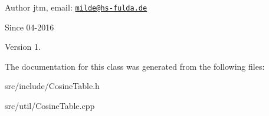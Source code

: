 \begin{DoxyAuthor}{Author}
jtm, email\-:  \href{mailto:milde@hs-fulda.de}{\tt milde@hs-\/fulda.\-de} 
\end{DoxyAuthor}
\begin{DoxySince}{Since}
04-\/2016 
\end{DoxySince}
\begin{DoxyVersion}{Version}
1. 
\end{DoxyVersion}


The documentation for this class was generated from the following files\-:\begin{DoxyCompactItemize}
\item 
src/include/Cosine\-Table.\-h\item 
src/util/Cosine\-Table.\-cpp\end{DoxyCompactItemize}
